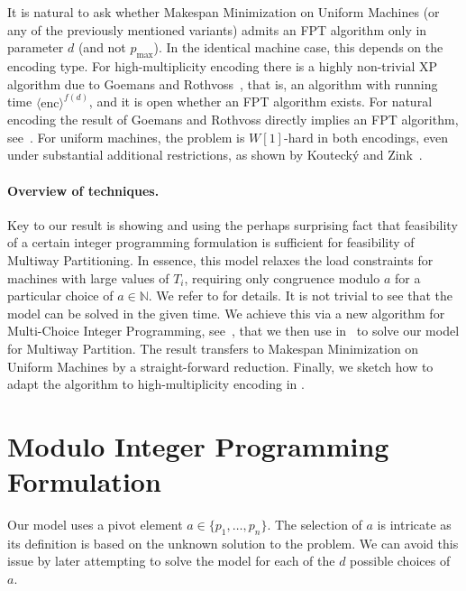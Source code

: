 \documentclass{article}
\newcommand{\N}{\mathbb{N}}
\begin{document}
It is natural to ask whether Makespan Minimization on Uniform Machines (or any of the previously mentioned variants)
admits an FPT algorithm only in parameter
$d$ (and not $p_{\max}$). In the identical machine case, this depends on the encoding type.
For high-multiplicity encoding there is a highly non-trivial XP algorithm due to Goemans and Rothvoss~\cite{goemans2020polynomiality}, that is, an algorithm with
running time $\langle\mathrm{enc}\rangle^{f(d)}$, and it is open whether an FPT algorithm exists.
For natural encoding the result of Goemans and Rothvoss directly implies an FPT algorithm,
see~\cite{KouteckyZ20}.
For uniform machines, the problem is $W[1]$-hard in both encodings, even under substantial
additional restrictions, as shown by Kouteck\'y and Zink~\cite{KouteckyZ20}.

\paragraph{Overview of techniques.}
Key to our result is showing and using the perhaps surprising fact that
feasibility of a certain integer programming formulation is sufficient
for feasibility of Multiway Partitioning. In essence, this model relaxes the load constraints for machines
with large values of $T_i$, requiring only congruence modulo $a$ for a particular choice of $a\in \N$.
We refer to  for details.
It is not trivial to see that the model can be solved in the given time.
We achieve this via a new algorithm for Multi-Choice Integer Programming, see~,
that we then use in~ to solve our model for Multiway Partition.
The result transfers to Makespan Minimization on Uniform Machines by a straight-forward reduction.
Finally, we sketch how to adapt the algorithm to high-multiplicity encoding in .

\section{Modulo Integer Programming Formulation}\label{sec:main}
Our model uses a pivot element $a \in \{p_1,\dotsc,p_n\}$.
The selection of $a$ is intricate as its definition is based on the unknown solution to the problem.
We can avoid this issue by later attempting
to solve the model for each of the $d$ possible choices of~$a$.
\end{document}
